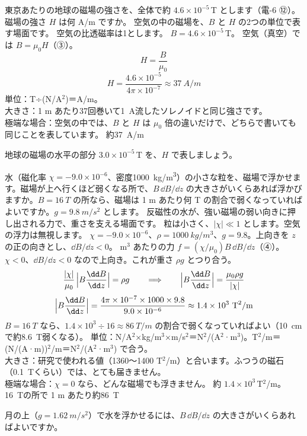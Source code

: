 \label{ph:電-7:ex9}
\begin{phreidai}[地球の磁場の $H$]
東京あたりの地球の磁場の強さを、全体で約 $4.6\times10^{-5}$\,T とします（電-6 ⑫）。磁場の強さ $H$ は何 A/m ですか。
\phbamen
空気の中の磁場を、$B$ と $H$ の2つの単位で表す場面です。
\phmushi
空気の比透磁率は1とします。
\phzu
$B=4.6\times10^{-5}$\,T。
\phriyu
空気（真空）では $B=\mu_0H$（③）。
\phtateru
\[H=\frac{B}{\mu_0}\]
\phtoku
\[H=\frac{4.6\times10^{-5}}{4\pi\times10^{-7}}\approx\qty{37}{A/m}\]
\phtashikame
単位：T÷(N/A$^2$)＝A/m。\\
大きさ：1 m あたり37回巻いて\qty{1}{A}流したソレノイドと同じ強さです。\\
極端な場合：空気の中では、$B$ と $H$ は $\mu_0$ 倍の違いだけで、どちらで書いても同じことを表しています。
\kotae 約\qty{37}{A/m}
\end{phreidai}
\begin{jibun}
地球の磁場の水平の部分 $3.0\times10^{-5}$\,T を、$H$ で表しましょう。
\end{jibun}

\label{ph:電-7:ex10}
\begin{phreidai}[水を磁石で浮かせる]
水（磁化率 $\chi=-9.0\times10^{-6}$、密度\qty{1000}{kg/m^3}）の小さな粒を、磁場で浮かせます。磁場が上へ行くほど弱くなる所で、$B\,\dd B/\dd z$ の大きさがいくらあれば浮かびますか。$B=\qty{16}{T}$ の所なら、磁場は 1 m あたり何 T の割合で弱くなっていればよいですか。$g=\qty{9.8}{m/s^2}$ とします。
\phbamen
反磁性の水が、強い磁場の弱い向きに押し出される力で、重さを支える場面です。
\phmushi
粒は小さく、$|\chi|\ll1$ とします。空気の浮力は無視します。
\phzu
$\chi=-9.0\times10^{-6}$、$\rho=\qty{1000}{kg/m^3}$、$g=9.8$。上向きを $z$ の正の向きとし、$\dd B/\dd z<0$。
 m$^3$ あたりの力 $f=(\chi/\mu_0)B\,\dd B/\dd z$（④）。$\chi<0$、$\dd B/\dd z<0$ なので上向き。これが重さ $\rho g$ とつり合う。
\phtateru
\[\frac{|\chi|}{\mu_0}\,\Bigl|B\frac{\dd B}{\dd z}\Bigr|=\rho g\qquad\Longrightarrow\qquad\Bigl|B\frac{\dd B}{\dd z}\Bigr|=\frac{\mu_0\rho g}{|\chi|}\]
\phtoku
\[\Bigl|B\frac{\dd B}{\dd z}\Bigr|=\frac{4\pi\times10^{-7}\times1000\times9.8}{9.0\times10^{-6}}\approx1.4\times10^3\ \text{T}^2\text{/m}\]
$B=\qty{16}{T}$ なら、$1.4\times10^3\div16\approx\qty{86}{T/m}$ の割合で弱くなっていればよい（\qty{10}{cm}で約\qty{8.6}{T}弱くなる）。
\phtashikame
単位：N/A$^2$×kg/m$^3$×m/s$^2$＝N$^2$/(A$^2$·m$^3$)。T$^2$/m＝(N/(A·m))$^2$/m＝N$^2$/(A$^2$·m$^3$) で合う。\\
大きさ：研究で使われる値（1360〜1400 T$^2$/m）と合います。ふつうの磁石（\qty{0.1}{T}くらい）では、とても届きません。\\
極端な場合：$\chi=0$ なら、どんな磁場でも浮きません。
\kotae 約 $1.4\times10^3$\,T$^2$/m。\qty{16}{T}の所で 1 m あたり約\qty{86}{T}
\end{phreidai}
\begin{jibun}
月の上（$g=\qty{1.62}{m/s^2}$）で水を浮かせるには、$B\,\dd B/\dd z$ の大きさがいくらあればよいですか。
\end{jibun}

